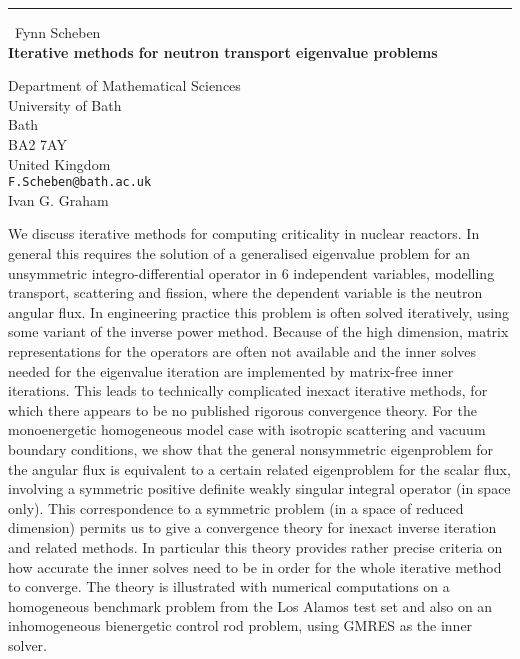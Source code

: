 \documentclass{report}
\begin{document}
\begin{center}
\rule{6in}{1pt} \
{\large Fynn Scheben \\
{\bf Iterative methods for neutron transport eigenvalue problems}}

Department of Mathematical Sciences \\ University of Bath \\ Bath \\ BA2 7AY \\ United Kingdom
\\
{\tt F.Scheben@bath.ac.uk}\\
Ivan G. Graham\end{center}

We discuss iterative methods for computing criticality in nuclear
reactors. In general this requires the solution of a generalised
eigenvalue problem for an unsymmetric integro-differential operator in 6
independent variables, modelling transport, scattering and fission, where
the dependent variable is the neutron angular flux. In engineering
practice this problem is often solved iteratively, using some variant of
the inverse power method. Because of the high dimension, matrix
representations for the operators are often not available and the inner
solves needed for the eigenvalue iteration are implemented by matrix-free
inner iterations. This leads to technically complicated inexact iterative
methods, for which there appears to be no published rigorous convergence
theory.
For the monoenergetic homogeneous model case with isotropic scattering
and vacuum boundary conditions, we show that the general nonsymmetric
eigenproblem for the angular flux is equivalent to a certain related
eigenproblem for the scalar flux, involving a symmetric positive definite
weakly singular integral operator (in space only). This correspondence to
a symmetric problem (in a space of reduced dimension) permits us to give
a convergence theory for inexact inverse iteration and related methods.
In particular this theory provides rather precise criteria on how
accurate the inner solves need to be in order for the whole iterative
method to converge. The theory is illustrated with numerical computations
on a homogeneous benchmark problem from the Los Alamos test set and also
on an inhomogeneous bienergetic control rod problem, using GMRES as the
inner solver.
\end{document}

